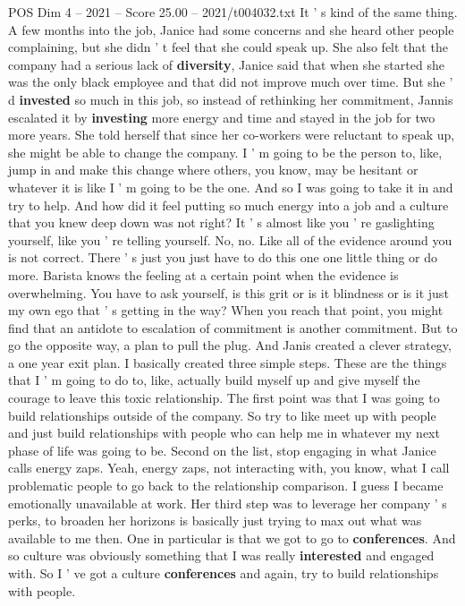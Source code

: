 \begin{textsample}{POS Dim 4 – 2021 – Score 25.00 – 2021/t004032.txt}
It ' s kind of the same thing.
A few months into the job, Janice had some concerns and she heard other people complaining, but she didn ' t feel that she could speak up.
She also felt that the company had a serious lack of \textbf{diversity}, Janice said that when she started she was the only black employee and that did not improve much over time.
But she ' d \textbf{invested} so much in this job, so instead of rethinking her commitment, Jannis escalated it by \textbf{investing} more energy and time and stayed in the job for two more years.
She told herself that since her co-workers were reluctant to speak up, she might be able to change the company.
I ' m going to be the person to, like, jump in and make this change where others, you know, may be hesitant or whatever it is like I ' m going to be the one.
And so I was going to take it in and try to help.
And how did it feel putting so much energy into a job and a culture that you knew deep down was not right?
It ' s almost like you ' re gaslighting yourself, like you ' re telling yourself.
No, no.
Like all of the evidence around you is not correct.
There ' s just you just have to do this one one little thing or do more.
Barista knows the feeling at a certain point when the evidence is overwhelming.
You have to ask yourself, is this grit or is it blindness or is it just my own ego that ' s getting in the way?
When you reach that point, you might find that an antidote to escalation of commitment is another commitment.
But to go the opposite way, a plan to pull the plug.
And Janis created a clever strategy, a one year exit plan.
I basically created three simple steps.
These are the things that I ' m going to do to, like, actually build myself up and give myself the courage to leave this toxic relationship.
The first point was that I was going to build relationships outside of the company.
So try to like meet up with people and just build relationships with people who can help me in whatever my next phase of life was going to be.
Second on the list, stop engaging in what Janice calls energy zaps.
Yeah, energy zaps, not interacting with, you know, what I call problematic people to go back to the relationship comparison.
I guess I became emotionally unavailable at work.
Her third step was to leverage her company ' s perks, to broaden her horizons is basically just trying to max out what was available to me then.
One in particular is that we got to go to \textbf{conferences}.
And so culture was obviously something that I was really \textbf{interested} and engaged with.
So I ' ve got a culture \textbf{conferences} and again, try to build relationships with people.

\end{textsample}
